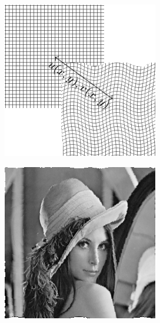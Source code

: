 \begin{figure}[H]
\begin{subfigure}[t]{0.3\textwidth}
      \includegraphics[width=\textwidth]{figuras/estimativa.png}
      \label{fig:estimativa}
    \end{subfigure}
    \begin{subfigure}[t]{0.3\textwidth}
      \includegraphics[width=\textwidth]{figuras/lenaRegistrada.png}

\end{subfigure}
\end{figure}
